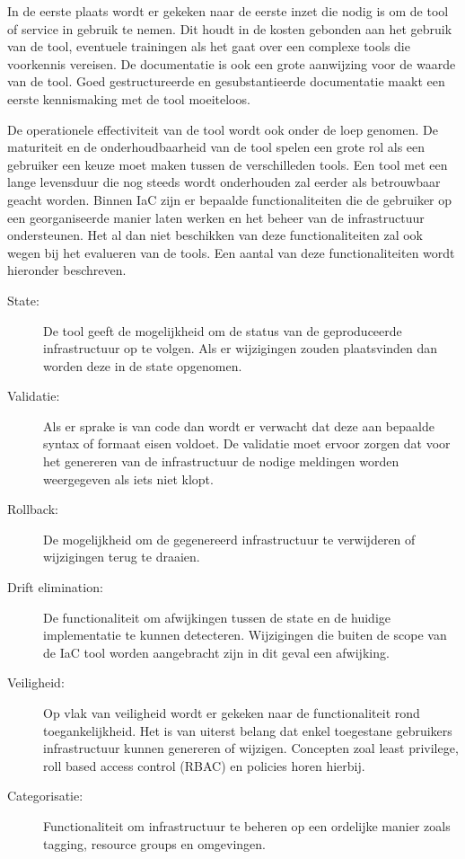 In de eerste plaats wordt er gekeken naar de eerste inzet die nodig is om de tool of service in gebruik te nemen.
Dit houdt in de kosten gebonden aan het gebruik van de tool, eventuele trainingen als het gaat over een complexe tools die voorkennis vereisen.
De documentatie is ook een grote aanwijzing voor de waarde van de tool.
Goed gestructureerde en gesubstantieerde documentatie maakt een eerste kennismaking met de tool moeiteloos.

De operationele effectiviteit van de tool wordt ook onder de loep genomen.
De maturiteit en de onderhoudbaarheid van de tool spelen een grote rol als een gebruiker een keuze moet maken tussen de verschilleden tools.
Een tool met een lange levensduur die nog steeds wordt onderhouden zal eerder als betrouwbaar geacht worden.
Binnen IaC zijn er bepaalde functionaliteiten die de gebruiker op een georganiseerde manier laten werken en het beheer van de infrastructuur ondersteunen.
Het al dan niet beschikken van deze functionaliteiten zal ook wegen bij het evalueren van de tools.
Een aantal van deze functionaliteiten wordt hieronder beschreven.

\begin{description}
    \item[State:] De tool geeft de mogelijkheid om de status van de geproduceerde infrastructuur op te volgen. Als er wijzigingen zouden plaatsvinden dan worden deze in de state opgenomen.
    \item[Validatie:] Als er sprake is van code dan wordt er verwacht dat deze aan bepaalde syntax of formaat eisen voldoet. De validatie moet ervoor zorgen dat voor het genereren van de infrastructuur de nodige meldingen worden weergegeven als iets niet klopt.
    \item[Rollback:] De mogelijkheid om de gegenereerd infrastructuur te verwijderen of wijzigingen terug te draaien.
    \item[Drift elimination:] De functionaliteit om afwijkingen tussen de state en de huidige implementatie te kunnen detecteren. Wijzigingen die buiten de scope van de IaC tool worden aangebracht zijn in dit geval een afwijking.
    \item[Veiligheid:] Op vlak van veiligheid wordt er gekeken naar de functionaliteit rond toegankelijkheid. Het is van uiterst belang dat enkel toegestane gebruikers infrastructuur kunnen genereren of wijzigen. Concepten zoal least privilege, roll based access control (RBAC) en policies horen hierbij.
    \item[Categorisatie:] Functionaliteit om infrastructuur te beheren op een ordelijke manier zoals tagging, resource groups en omgevingen.
\end{description}

